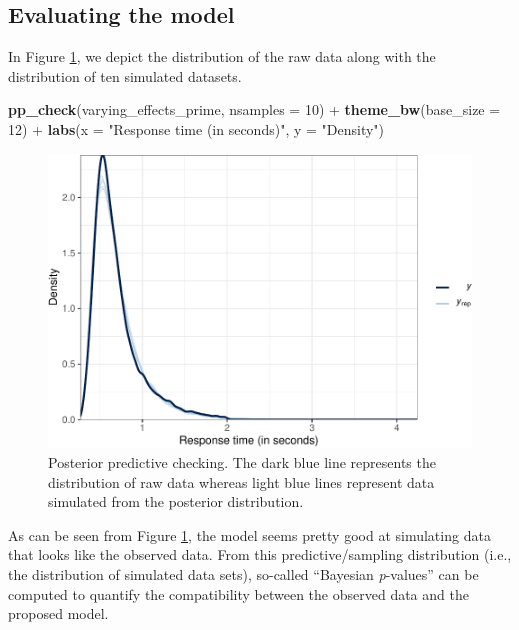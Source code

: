 \documentclass[
  11pt,
  english,
  ,doc,floatsintext]{apa6}
\newenvironment{Shaded}{}{}
\newcommand{\DataTypeTok}[1]{\textcolor[rgb]{0.56,0.13,0.00}{#1}}
\newcommand{\DecValTok}[1]{\textcolor[rgb]{0.25,0.63,0.44}{#1}}
\newcommand{\KeywordTok}[1]{\textcolor[rgb]{0.00,0.44,0.13}{\textbf{#1}}}
\newcommand{\NormalTok}[1]{#1}
\newcommand{\OperatorTok}[1]{\textcolor[rgb]{0.40,0.40,0.40}{#1}}
\newcommand{\StringTok}[1]{\textcolor[rgb]{0.25,0.44,0.63}{#1}}
\begin{document}
\newpage

\hypertarget{evaluating-the-model}{%
\subsection{Evaluating the model}\label{evaluating-the-model}}

In Figure \ref{fig:ppc}, we depict the distribution of the raw data along with the distribution of ten simulated datasets.

\begin{Shaded}
\begin{Highlighting}[]
\KeywordTok{pp_check}\NormalTok{(varying_effects_prime, }\DataTypeTok{nsamples =} \DecValTok{10}\NormalTok{) }\OperatorTok{+}
\StringTok{  }\KeywordTok{theme_bw}\NormalTok{(}\DataTypeTok{base_size =} \DecValTok{12}\NormalTok{) }\OperatorTok{+}
\StringTok{  }\KeywordTok{labs}\NormalTok{(}\DataTypeTok{x =} \StringTok{"Response time (in seconds)"}\NormalTok{, }\DataTypeTok{y =} \StringTok{"Density"}\NormalTok{)}
\end{Highlighting}
\end{Shaded}

\begin{figure}[!htb]

{\centering \includegraphics[width=0.75\linewidth]{supplementary_materials_files/figure-latex/ppc-1} 

}

\caption{Posterior predictive checking. The dark blue line represents the distribution of raw data whereas light blue lines represent data simulated from the posterior distribution.}\label{fig:ppc}
\end{figure}

As can be seen from Figure \ref{fig:ppc}, the model seems pretty good at simulating data that looks like the observed data. From this predictive/sampling distribution (i.e., the distribution of simulated data sets), so-called \enquote{Bayesian \emph{p}-values} can be computed to quantify the compatibility between the observed data and the proposed model.
\end{document}
